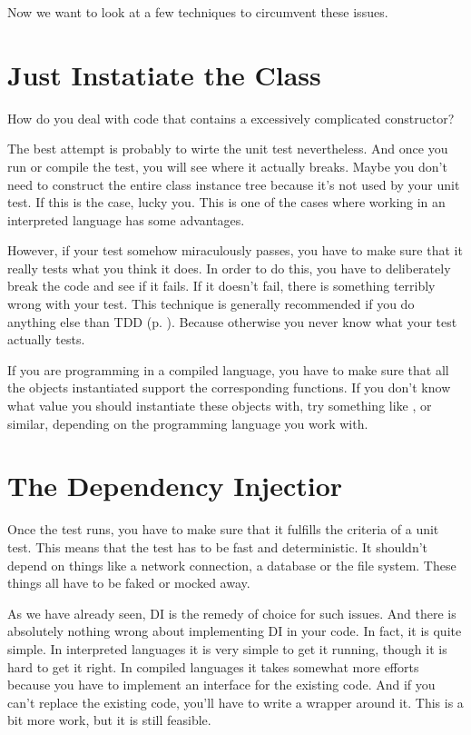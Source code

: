 Now we want to look at a few techniques to circumvent these issues.

\section{Just Instatiate the Class}

How do you deal with code that contains a excessively complicated constructor?

The best attempt is probably to wirte the unit test nevertheless. And once you run or compile the test, you will see where it actually breaks. Maybe you don't need to construct the entire class instance tree because it's not used by your unit test. If this is the case, lucky you. This is one of the cases where working in an interpreted language has some advantages.

However, if your test somehow miraculously passes, you have to make sure that it really tests what you think it does. In order to do this, you have to deliberately break the code and see if it fails. If it doesn't fail, there is something terribly wrong with your test. This technique is generally recommended if you do anything else than TDD (p. \pageref{chap:tdd}). Because otherwise you never know what your test actually tests.

If you are programming in a compiled language, you have to make sure that all the objects instantiated support the corresponding functions. If you don't know what value you should instantiate these objects with, try something like ,  or similar, depending on the programming language you work with.

\section{The Dependency Injectior}\label{sec:dependency_injector}

Once the test runs, you have to make sure that it fulfills the criteria of a unit test. This means that the test has to be fast and deterministic. It shouldn't depend on things like a network connection, a database or the file system. These things all have to be faked or mocked away.

As we have already seen, DI is the remedy of choice for such issues. And there is absolutely nothing wrong about implementing DI in your code. In fact, it is quite simple. In interpreted languages it is very simple to get it running, though it is hard to get it right. In compiled languages it takes somewhat more efforts because you have to implement an interface for the existing code. And if you can't replace the existing code, you'll have to write a wrapper around it. This is a bit more work, but it is still feasible. 

